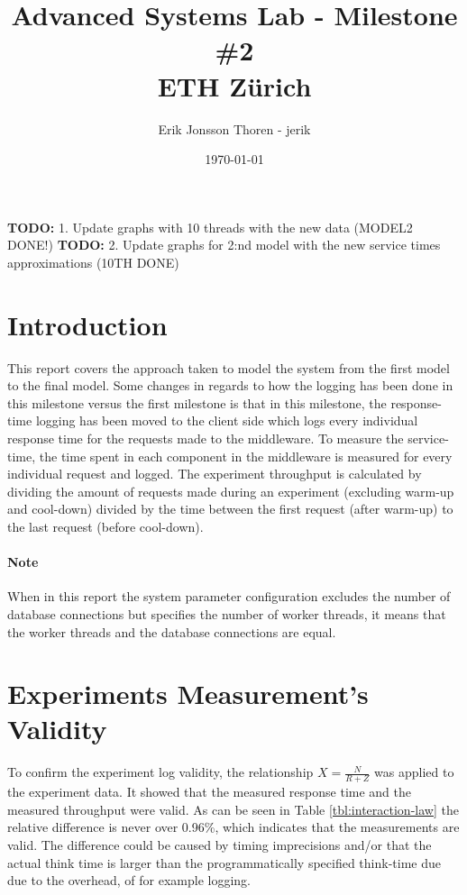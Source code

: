 \documentclass[a4paper, 11pt]{article}
\title{Advanced Systems Lab - Milestone \#2\\
\small{ETH Zürich}}
\author{Erik Jonsson Thoren - jerik\\}
\date{\today}
\newcommand{\TODO}[1]{\textbf{TODO:} #1}
\begin{document}
\maketitle
\tableofcontents
\newpage

\TODO{1. Update graphs with 10 threads with the new data (MODEL2 DONE!)}
\TODO{2. Update graphs for 2:nd model with the new service times approximations (10TH DONE)}


\section{Introduction}
This report covers the approach taken to model the system from the first model to the final model. Some changes in regards to how the logging has been done in this milestone versus the first milestone is that in this milestone, the response-time logging has been moved to the client side which logs every individual response time for the requests made to the middleware. To measure the service-time, the time spent in each component in the middleware is measured for every individual request and logged. The experiment throughput is calculated by dividing the amount of requests made during an experiment (excluding warm-up and cool-down) divided by the time between the first request (after warm-up) to the last request (before cool-down).

\paragraph{Note} When in this report the system parameter configuration excludes the number of database connections but specifies the number of worker threads, it means that the worker threads and the database connections are equal.

\section{Experiments Measurement's Validity}
	To confirm the experiment log validity, the relationship $X=\frac{N}{R+Z}$ was applied to the experiment data. It showed that the measured response time and the measured throughput were valid. As can be seen in Table \ref{tbl:interaction-law} the relative difference is never over 0.96\%, which indicates that the measurements are valid. The difference could be caused by timing imprecisions and/or that the actual think time is larger than the programmatically specified think-time due due to the overhead, of for example logging.
\end{document}
